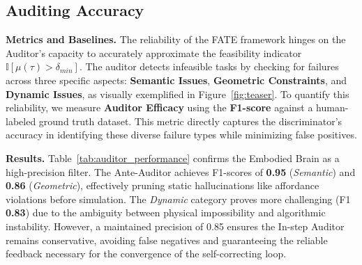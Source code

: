 \documentclass{article}
\theoremstyle{plain}
\theoremstyle{definition}
\theoremstyle{remark}
\begin{document}
\subsection{Auditing Accuracy}
\label{sec:exp_auditor}
\textbf{Metrics and Baselines.}
The reliability of the FATE framework hinges on the Auditor's capacity to accurately approximate the feasibility indicator $\mathbb{I}[\mu(\tau) > \delta_{min}]$. The auditor detects infeasible tasks by checking for failures across three specific aspects: \textbf{Semantic Issues}, \textbf{Geometric Constraints}, and \textbf{Dynamic Issues}, as visually exemplified in Figure~\ref{fig:teaser}. To quantify this reliability, we measure \textbf{Auditor Efficacy} using the \textbf{F1-score} against a human-labeled ground truth dataset. This metric directly captures the discriminator's accuracy in identifying these diverse failure types while minimizing false positives.
\begin{table}[t]
\centering
\vspace{-.5cm}
\caption{\textbf{Diagnostic Performance of the Auditor.} We report the Precision, Recall, and F1-Score of the FATE Auditor across three error categories on a human-labeled test set. }
\label{tab:auditor_performance}
\vspace{-.5cm}
\end{table}
\textbf{Results.} Table~\ref{tab:auditor_performance} confirms the Embodied Brain as a high-precision filter. The Ante-Auditor achieves F1-scores of \textbf{0.95} (\textit{Semantic}) and \textbf{0.86} (\textit{Geometric}), effectively pruning static hallucinations like affordance violations before simulation. The \textit{Dynamic} category proves more challenging (F1 \textbf{0.83}) due to the ambiguity between physical impossibility and algorithmic instability. However, a maintained precision of 0.85 ensures the In-step Auditor remains conservative, avoiding false negatives and guaranteeing the reliable feedback necessary for the convergence of the self-correcting loop.
\end{document}
